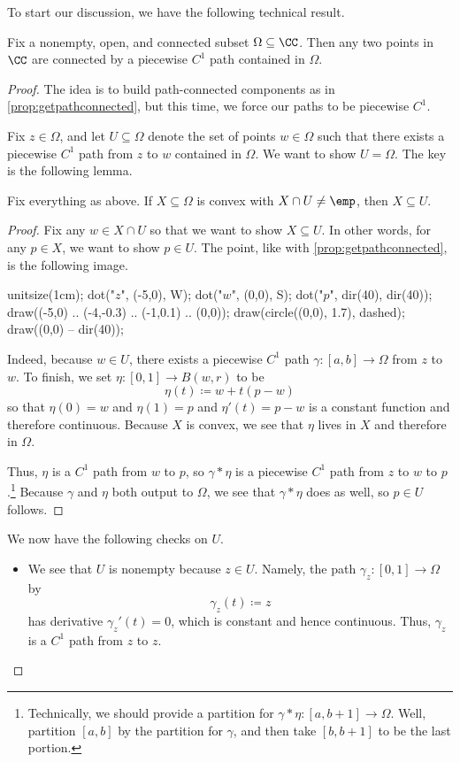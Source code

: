 \documentclass[../notes.tex]{subfiles}
\begin{document}
To start our discussion, we have the following technical result.
\begin{lemma}
	Fix a nonempty, open, and connected subset $\Omega\subseteq\CC$. Then any two points in $\CC$ are connected by a piecewise $C^1$ path contained in $\Omega$.
\end{lemma}
\begin{proof}
	The idea is to build path-connected components as in \autoref{prop:getpathconnected}, but this time, we force our paths to be piecewise $C^1$.

	Fix $z\in\Omega$, and let $U\subseteq\Omega$ denote the set of points $w\in \Omega$ such that there exists a piecewise $C^1$ path from $z$ to $w$ contained in $\Omega$. We want to show $U=\Omega$. The key is the following lemma.
	\begin{lemma} \label{lem:convexinconnectedcomp}
		Fix everything as above. If $X\subseteq\Omega$ is convex with $X\cap U\ne\emp$, then $X\subseteq U$.
	\end{lemma}
	\begin{proof}
		Fix any $w\in X\cap U$ so that we want to show $X\subseteq U$. In other words, for any $p\in X$, we want to show $p\in U$. The point, like with \autoref{prop:getpathconnected}, is the following image.
		\begin{center}
			\begin{asy}
				unitsize(1cm);
				dot("$z$", (-5,0), W);
				dot("$w$", (0,0), S);
				dot("$p$", dir(40), dir(40));
				draw((-5,0) .. (-4,-0.3) .. (-1,0.1) .. (0,0));
				draw(circle((0,0), 1.7), dashed);
				draw((0,0) -- dir(40));
			\end{asy}
		\end{center}
		Indeed, because $w\in U$, there exists a piecewise $C^1$ path $\gamma\colon [a,b]\to\Omega$ from $z$ to $w$. To finish, we set $\eta\colon [0,1]\to B(w,r)$ to be
		\[\eta(t)\coloneqq w+t(p-w)\]
		so that $\eta(0)=w$ and $\eta(1)=p$ and $\eta'(t)=p-w$ is a constant function and therefore continuous. Because $X$ is convex, we see that $\eta$ lives in $X$ and therefore in $\Omega$.
		
		Thus, $\eta$ is a $C^1$ path from $w$ to $p$, so $\gamma*\eta$ is a piecewise $C^1$ path from $z$ to $w$ to $p$.\footnote{Technically, we should provide a partition for $\gamma*\eta\colon [a,b+1]\to\Omega$. Well, partition $[a,b]$ by the partition for $\gamma$, and then take $[b,b+1]$ to be the last portion.} Because $\gamma$ and $\eta$ both output to $\Omega$, we see that $\gamma*\eta$ does as well, so $p\in U$ follows.
	\end{proof}
	We now have the following checks on $U$.
	\begin{itemize}
		\item We see that $U$ is nonempty because $z\in U$. Namely, the path $\gamma_z\colon [0,1]\to\Omega$ by
		\[\gamma_z(t)\coloneqq z\]
		has derivative $\gamma_z'(t)=0$, which is constant and hence continuous. Thus, $\gamma_z$ is a $C^1$ path from $z$ to $z$.


\end{itemize}
\end{proof}
\end{document}
